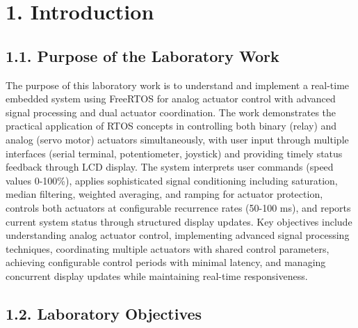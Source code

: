\documentclass[12pt]{article}
\begin{document}
\setcounter{page}{1}
\pagestyle{fancy}
\fancyhf{}
\rhead{\thepage}

\section*{1. Introduction}

\subsection*{1.1. Purpose of the Laboratory Work}

The purpose of this laboratory work is to understand and implement a real-time embedded system using FreeRTOS for analog actuator control with advanced signal processing and dual actuator coordination. The work demonstrates the practical application of RTOS concepts in controlling both binary (relay) and analog (servo motor) actuators simultaneously, with user input through multiple interfaces (serial terminal, potentiometer, joystick) and providing timely status feedback through LCD display. The system interprets user commands (speed values 0-100\%), applies sophisticated signal conditioning including saturation, median filtering, weighted averaging, and ramping for actuator protection, controls both actuators at configurable recurrence rates (50-100 ms), and reports current system status through structured display updates. Key objectives include understanding analog actuator control, implementing advanced signal processing techniques, coordinating multiple actuators with shared control parameters, achieving configurable control periods with minimal latency, and managing concurrent display updates while maintaining real-time responsiveness.

\subsection*{1.2. Laboratory Objectives}
\end{document}

